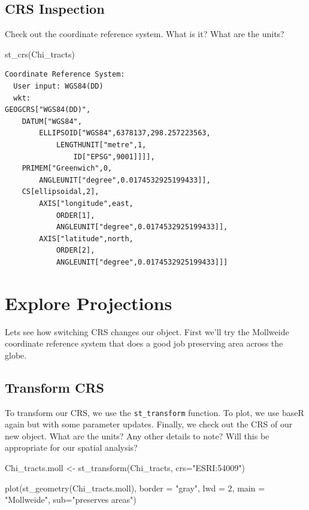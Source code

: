 \documentclass[
  letterpaper,
  DIV=11,
  numbers=noendperiod]{scrreprt}
\newenvironment{Shaded}{\begin{snugshade}}{\end{snugshade}}
\newcommand{\AttributeTok}[1]{\textcolor[rgb]{0.40,0.45,0.13}{#1}}
\newcommand{\DecValTok}[1]{\textcolor[rgb]{0.68,0.00,0.00}{#1}}
\newcommand{\FunctionTok}[1]{\textcolor[rgb]{0.28,0.35,0.67}{#1}}
\newcommand{\NormalTok}[1]{\textcolor[rgb]{0.00,0.23,0.31}{#1}}
\newcommand{\OtherTok}[1]{\textcolor[rgb]{0.00,0.23,0.31}{#1}}
\newcommand{\StringTok}[1]{\textcolor[rgb]{0.13,0.47,0.30}{#1}}
\begin{document}
\subsection{CRS Inspection}\label{crs-inspection}

Check out the coordinate reference system. What is it? What are the
units?

\begin{Shaded}
\begin{Highlighting}[]
\FunctionTok{st\_crs}\NormalTok{(Chi\_tracts)}
\end{Highlighting}
\end{Shaded}

\begin{verbatim}
Coordinate Reference System:
  User input: WGS84(DD) 
  wkt:
GEOGCRS["WGS84(DD)",
    DATUM["WGS84",
        ELLIPSOID["WGS84",6378137,298.257223563,
            LENGTHUNIT["metre",1,
                ID["EPSG",9001]]]],
    PRIMEM["Greenwich",0,
        ANGLEUNIT["degree",0.0174532925199433]],
    CS[ellipsoidal,2],
        AXIS["longitude",east,
            ORDER[1],
            ANGLEUNIT["degree",0.0174532925199433]],
        AXIS["latitude",north,
            ORDER[2],
            ANGLEUNIT["degree",0.0174532925199433]]]
\end{verbatim}

\section{Explore Projections}\label{explore-projections}

Lets see how switching CRS changes our object. First we'll try the
Mollweide coordinate reference system that does a good job preserving
area across the globe.

\subsection{Transform CRS}\label{transform-crs}

To transform our CRS, we use the \texttt{st\_transform} function. To
plot, we use baseR again but with some parameter updates. Finally, we
check out the CRS of our new object. What are the units? Any other
details to note? Will this be appropriate for our spatial analysis?

\begin{Shaded}
\begin{Highlighting}[]
\NormalTok{Chi\_tracts.moll }\OtherTok{\textless{}{-}} \FunctionTok{st\_transform}\NormalTok{(Chi\_tracts, }\AttributeTok{crs=}\StringTok{"ESRI:54009"}\NormalTok{)}

\FunctionTok{plot}\NormalTok{(}\FunctionTok{st\_geometry}\NormalTok{(Chi\_tracts.moll), }\AttributeTok{border =} \StringTok{"gray"}\NormalTok{, }\AttributeTok{lwd =} \DecValTok{2}\NormalTok{, }\AttributeTok{main =} \StringTok{"Mollweide"}\NormalTok{, }\AttributeTok{sub=}\StringTok{"preserves areas"}\NormalTok{)}
\end{Highlighting}
\end{Shaded}
\end{document}
